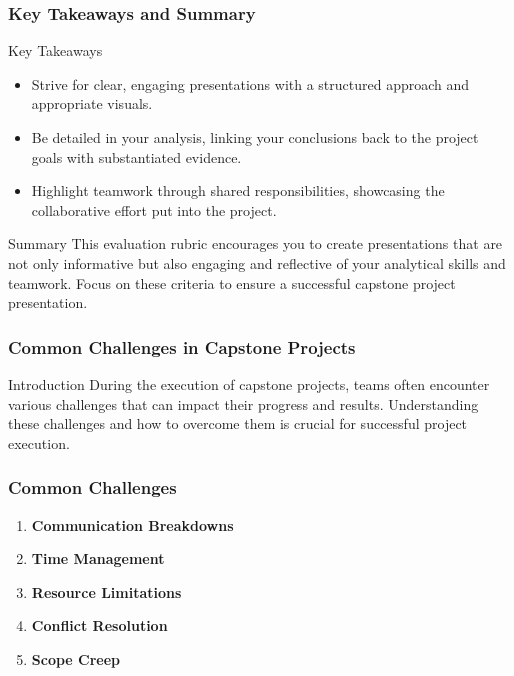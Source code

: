 \documentclass[aspectratio=169]{beamer}
\begin{document}
\begin{frame}[fragile]
    \frametitle{Key Takeaways and Summary}
    \begin{block}{Key Takeaways}
        \begin{itemize}
            \item Strive for clear, engaging presentations with a structured approach and appropriate visuals.
            \item Be detailed in your analysis, linking your conclusions back to the project goals with substantiated evidence.
            \item Highlight teamwork through shared responsibilities, showcasing the collaborative effort put into the project.
        \end{itemize}
    \end{block}

    \begin{block}{Summary}
        This evaluation rubric encourages you to create presentations that are not only informative but also engaging and reflective of your analytical skills and teamwork. Focus on these criteria to ensure a successful capstone project presentation.
    \end{block}

\end{frame}

\begin{frame}[fragile]
    \frametitle{Common Challenges in Capstone Projects}
    \begin{block}{Introduction}
        During the execution of capstone projects, teams often encounter various challenges that can impact their progress and results. Understanding these challenges and how to overcome them is crucial for successful project execution.
    \end{block}
\end{frame}

\begin{frame}[fragile]
    \frametitle{Common Challenges}
    \begin{enumerate}
        \item \textbf{Communication Breakdowns}
        \item \textbf{Time Management}
        \item \textbf{Resource Limitations}
        \item \textbf{Conflict Resolution}
        \item \textbf{Scope Creep}
    \end{enumerate}
\end{frame}
\end{document}
